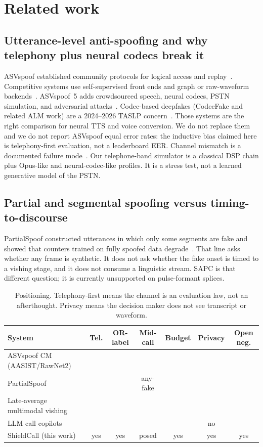 \documentclass[11pt]{article}
\begin{document}
\section{Related work}

\subsection{Utterance-level anti-spoofing and why telephony plus neural codecs break it}
ASVspoof established community protocols for logical access and replay~\cite{todisco2019asvspoof,wang2020asvspoof}. Competitive systems use self-supervised front ends and graph or raw-waveform backends~\cite{jung2022aasist,tak2021end}. ASVspoof~5 adds crowdsourced speech, neural codecs, PSTN simulation, and adversarial attacks~\cite{liu2023asvspoof5,wang2026asvspoof5}. Codec-based deepfakes (CodecFake and related ALM work) are a 2024--2026 TASLP concern~\cite{xie2025codecfake}. Those systems are the right comparison for neural TTS and voice conversion. We do not replace them and we do not report ASVspoof equal error rates: the inductive bias claimed here is telephony-first evaluation, not a leaderboard EER. Channel mismatch is a documented failure mode~\cite{zhang2021channel}. Our telephone-band simulator is a classical DSP chain plus Opus-like and neural-codec-like profiles. It is a stress test, not a learned generative model of the PSTN.

\subsection{Partial and segmental spoofing versus timing-to-discourse}
PartialSpoof constructed utterances in which only some segments are fake and showed that counters trained on fully spoofed data degrade~\cite{zhang2021partial,zhang2023partialspoof}. That line asks whether any frame is synthetic. It does not ask whether the fake onset is timed to a vishing stage, and it does not consume a linguistic stream. SAPC is that different question; it is currently unsupported on pulse-formant splices.

\begin{table}[t]
\centering
\caption{Positioning. Telephony-first means the channel is an evaluation law, not an afterthought. Privacy means the decision maker does not see transcript or waveform.}
\label{tab:pos}
\scriptsize
\begin{tabular}{lcccccc}
\toprule
System & Tel. & OR-label & Mid-call & Budget & Privacy & Open neg. \\
\midrule
ASVspoof CM (AASIST/RawNet2) & & & & & & \\
PartialSpoof & & & any-fake & & & \\
Late-average multimodal vishing & & & & & & \\
LLM call copilots & & & & & no & \\
ShieldCall (this work) & yes & yes & posed & yes & yes & yes \\
\bottomrule
\end{tabular}
\end{table}
\end{document}
